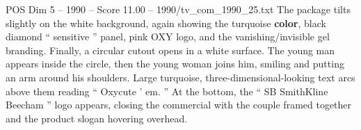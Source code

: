 \begin{textsample}{POS Dim 5 – 1990 – Score 11.00 – 1990/tv\_com\_1990\_25.txt}
The package tilts slightly on the white background, again showing the turquoise \textbf{color}, black diamond “ sensitive ” panel, pink OXY logo, and the vanishing/invisible gel branding.
Finally, a circular cutout opens in a white surface.
The young man appears inside the circle, then the young woman joins him, smiling and putting an arm around his shoulders.
Large turquoise, three-dimensional-looking text arcs above them reading “ Oxycute ’ em. ” At the bottom, the “ SB SmithKline Beecham ” logo appears, closing the commercial with the couple framed together and the product slogan hovering overhead.

\end{textsample}
